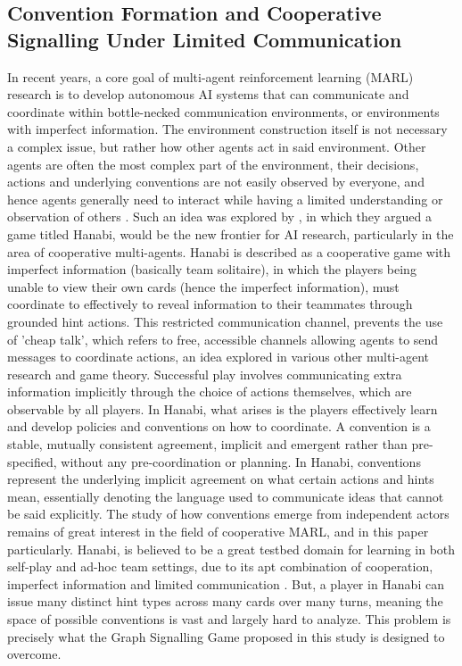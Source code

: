 \documentclass[a4paper,twoside,12pt]{report}
\begin{document}
    \subsection*{Convention Formation and Cooperative Signalling Under Limited Communication}
    In recent years, a core goal of multi-agent reinforcement learning (MARL) research is to develop autonomous AI systems that can communicate and coordinate within bottle-necked communication environments, or environments with imperfect information. The environment construction itself is not necessary a complex issue, but rather how other agents act in said environment. Other agents are often the most complex part of the environment, their decisions, actions and underlying conventions are not easily observed by everyone, and hence agents generally need to interact while having a limited understanding or observation of others \citep{hu2020decoder}. Such an idea was explored by \citep{hu2020decoder}, in which they argued a game titled Hanabi, would be the new frontier for AI research, particularly in the area of cooperative multi-agents. Hanabi is described as a cooperative game with imperfect information (basically team solitaire), in which the players being unable to view their own cards (hence the imperfect information), must coordinate to effectively to reveal information to their teammates through grounded hint actions. This restricted communication channel, prevents the use of 'cheap talk', which refers to free, accessible channels allowing agents to send messages to coordinate actions, an idea explored in various other multi-agent research and game theory. Successful play involves communicating extra information implicitly through the choice of actions themselves, which are observable by all players.
    \newline
    \newline
    In Hanabi, what arises is the players effectively learn and develop policies and conventions on how to coordinate. A convention is a stable, mutually consistent agreement, implicit and emergent rather than pre-specified, without any pre-coordination or planning. In Hanabi, conventions represent the underlying implicit agreement on what certain actions and hints mean, essentially denoting the language used to communicate ideas that cannot be said explicitly. The study of how conventions emerge from independent actors remains of great interest in the field of cooperative MARL, and in this paper particularly. Hanabi, is believed to be a great testbed domain for learning in both self-play and ad-hoc team settings, due to its apt combination of cooperation, imperfect information and limited communication \citep{bard2019}. But,  a player in Hanabi can issue many distinct hint types across many cards over many turns, meaning the space of possible conventions is vast and largely hard to analyze. This problem is precisely what the Graph Signalling Game proposed in this study is designed to overcome.
\end{document}
